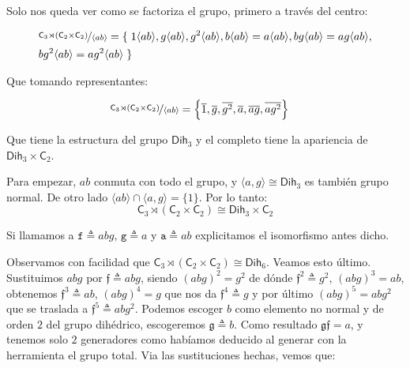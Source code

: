 \documentclass[12pt,a4paper,fleqn,spanish,final,openright]{extbook}
\theoremstyle{definition}
\theoremstyle{remark}
\begin{document}
Solo nos queda ver como se factoriza el grupo, primero a través del centro:
 
\begin{align*}
&
\nicefrac
{\mathsf{C}_{3}\rtimes\left({\mathsf{C}_{2}}\times{\mathsf{C}_{2}}\right)}
{\left\langle ab \right\rangle}
=
\left\lbrace\right.
1{\left\langle{ab}\right\rangle},
g{\left\langle{ab}\right\rangle},
g^2{\left\langle{ab}\right\rangle},
b{\left\langle{ab}\right\rangle}=
a{\left\langle{ab}\right\rangle},
bg{\left\langle{ab}\right\rangle}
=
ag{\left\langle{ab}\right\rangle},\\
&
bg^2{\left\langle{ab}\right\rangle}
=
ag^2{\left\langle{ab}\right\rangle}
\left.\right\rbrace
\end{align*}

Que tomando representantes:

\begin{align*}
&
\nicefrac
{\mathsf{C}_{3}\rtimes\left({\mathsf{C}_{2}}\times{\mathsf{C}_{2}}\right)}
{\left\langle ab \right\rangle}
=
\left\lbrace
\overline{1},
\overline{g},
\overline{g^2},
\overline{a},
\overline{ag},
\overline{ag^2}
\right\rbrace
\end{align*}

Que tiene la estructura del grupo $\mathsf{Dih}_{3}$ y el completo tiene la apariencia de $\mathsf{Dih}_{3}\times\mathsf{C}_{2}$. 

Para empezar, $ab$ conmuta con todo el grupo, y $\langle a,g \rangle\cong\mathsf{Dih}_{3}$ es también grupo normal. De otro lado $\langle ab\rangle \cap \langle a,g \rangle = \lbrace 1 \rbrace$. Por lo tanto: 
\[
{\mathsf{C}_{3}\rtimes\left({\mathsf{C}_{2}\times\mathsf{C}_{2}}\right)}\cong{\mathsf{Dih}_{3}\times\mathsf{C}_{2}}
\]

Si llamamos a $\mathtt{f}\triangleq abg$, $\mathtt{g}\triangleq a$ y $\mathtt{a} \triangleq ab$ explicitamos el isomorfismo antes dicho. 

Observamos con facilidad que ${\mathsf{C}_{3}}\rtimes{\left({{\mathsf{C}_{2}}\times{\mathsf{C}_{2}}}\right)}\cong\mathsf{Dih}_{6}$. Veamos esto último. Sustituimos $abg$ por $\mathfrak{f}\triangleq abg$, siendo $(abg)^2 = g^2$ de dónde  $\mathfrak{f}^{2}\triangleq g^2$, ${(abg)}^{3}=ab$, obtenemos $\mathfrak{f}^{3}\triangleq ab$, $(abg)^{4}= g$ que nos da $\mathfrak{f}^{4}\triangleq g$ y por último $(abg)^{5}= abg^2$ que se traslada a $\mathfrak{f}^{5}\triangleq abg^2$.  Podemos escoger $b$ como elemento no normal y de orden $2$ del grupo dihédrico, escogeremos $\mathfrak{g}\triangleq b$. Como resultado $\mathfrak{gf}=a$, y tenemos solo $2$ generadores como habíamos deducido al generar con la herramienta el grupo total. Via las sustituciones hechas, vemos que:
 
\end{document}
